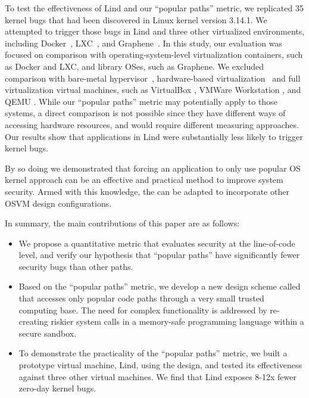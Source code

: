 To test the effectiveness of Lind and our ``popular paths'' metric, 
we replicated 35 kernel bugs that had been
discovered in Linux kernel version 3.14.1.  We attempted to trigger those
bugs in Lind and three other virtualized environments,
including Docker~\cite{Docker}, LXC~\cite{LXC}, and Graphene~\cite{Graphene-14}. 
In this study, our evaluation was focused on comparison with operating-system-level virtualization containers, such as Docker and LXC, 
and library OSes, such as Graphene. 
We excluded comparison with bare-metal hypervisor~\cite{Xen-03, VMWare-Server}, 
hardware-based virtualization~\cite{IntelVT, keller2010nohype} and full virtualization 
virtual machines, such as VirtualBox \cite{VirtualBox}, VMWare Workstation \cite{VMWare-Workstation}, and QEMU \cite{QEMU}. 
While our ``popular paths'' metric may potentially apply to those
systems, a direct comparison is not possible since they have different 
ways of accessing hardware resources, and would require different measuring approaches.
Our results show that applications in Lind were substantially less likely to trigger kernel bugs.

By so doing we demonstrated that forcing an application to only use popular
OS kernel approach can be an effective and practical method to improve
system security. Armed with this knowledge, the \lip can be adapted to incorporate other OSVM design configurations. 

In summary, the main contributions of this paper are as follows:

\begin{itemize}\setlength\itemsep{0em}
\item
We propose a quantitative metric that evaluates security at the line-of-code level, 
and verify our hypothesis that ``popular paths'' have significantly fewer security bugs than other paths. 
\item
Based on the ``popular paths'' metric, we develop a new design scheme called \lip that accesses only popular code paths through a very small trusted computing base. 
The need for complex functionality is addressed by re-creating riskier system calls in a memory-safe programming language within a secure sandbox.
\item
To demonstrate the practicality of the ``popular paths'' metric, we built a prototype virtual machine, Lind, using the \lip design, 
and tested its effectiveness against three other virtual machines. We find that Lind exposes 8-12x fewer zero-day kernel bugs. 
\end{itemize}
